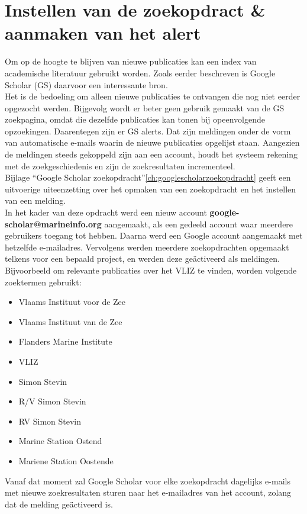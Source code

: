 \section{Instellen van de zoekopdract \& aanmaken van het alert}
Om op de hoogte te blijven van nieuwe publicaties kan een index van academische literatuur gebruikt worden. Zoals eerder beschreven is Google Scholar (GS) daarvoor een interessante bron.\\
Het is de bedoeling om alleen nieuwe publicaties te ontvangen die nog niet eerder opgezocht werden. Bijgevolg wordt er beter geen gebruik gemaakt van de GS zoekpagina, omdat die dezelfde publicaties kan tonen bij opeenvolgende opzoekingen. Daarentegen zijn er GS alerts. Dat zijn meldingen onder de vorm van automatische e-mails waarin de nieuwe publicaties opgelijst staan. Aangezien de meldingen steeds gekoppeld zijn aan een account, houdt het systeem rekening met de zoekgeschiedenis en zijn de zoekresultaten incrementeel.\\
Bijlage ``Google Scholar zoekopdracht''\ref{ch:googlescholarzoekopdracht} geeft een uitvoerige uiteenzetting over het opmaken van een zoekopdracht en het instellen van een melding.\\
In het kader van deze opdracht werd een nieuw account \textbf{google-scholar@marineinfo.org} aangemaakt, als een gedeeld account waar meerdere gebruikers toegang tot hebben. Daarna werd een Google account aangemaakt met hetzelfde e-mailadres. Vervolgens werden meerdere zoekopdrachten opgemaakt telkens voor een bepaald project, en werden deze geäctiveerd als meldingen.\\
Bijvoorbeeld om relevante publicaties over het VLIZ te vinden, worden volgende zoektermen gebruikt:
\begin{itemize}
    \item Vlaams Instituut voor de Zee
    \item Vlaams Instituut van de Zee
    \item Flanders Marine Institute
    \item VLIZ
    \item Simon Stevin
    \item R/V Simon Stevin
    \item RV Simon Stevin
    \item Marine Station Ostend
    \item Mariene Station Oostende
\end{itemize}

Vanaf dat moment zal Google Scholar voor elke zoekopdracht dagelijks e-mails met nieuwe zoekresultaten sturen naar het e-mailadres van het account, zolang dat de melding geäctiveerd is.